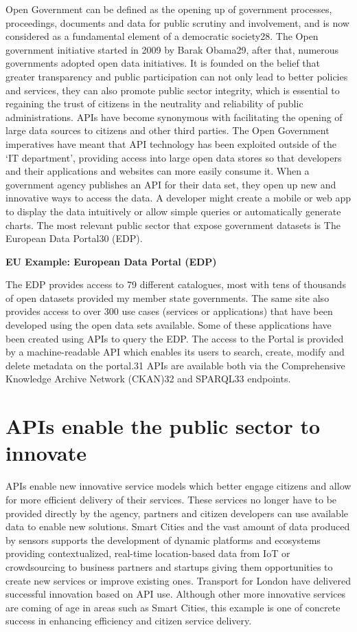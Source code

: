 Open Government can be defined as the opening up of government processes, proceedings, documents
and data for public scrutiny and involvement, and is now considered as a fundamental element of a
democratic society28. The Open government initiative started in 2009 by Barak Obama29, after that,
numerous governments adopted open data initiatives. It is founded on the belief that greater transparency
and public participation can not only lead to better policies and services, they can also promote public
sector integrity, which is essential to regaining the trust of citizens in the neutrality and reliability of public
administrations.
APIs have become synonymous with facilitating the opening of large data sources to citizens and other third
parties. The Open Government imperatives have meant that API technology has been exploited outside of
the ‘IT department’, providing access into large open data stores so that developers and their applications
and websites can more easily consume it. When a government agency publishes an API for their data set,
they open up new and innovative ways to access the data. A developer might create a mobile or web app to
display the data intuitively or allow simple queries or automatically generate charts.
The most relevant public sector that expose government datasets is The European Data Portal30 (EDP).

\textbf{EU Example: European Data Portal (EDP)}

The EDP provides access to 79 different catalogues, most with tens of thousands of open datasets
provided my member state governments. The same site also provides access to over 300 use
cases (services or applications) that have been developed using the open data sets available.
Some of these applications have been created using APIs to query the EDP.
The access to the Portal is provided by a machine-readable API which enables its users to search,
create, modify and delete metadata on the portal.31 APIs are available both via the Comprehensive
Knowledge Archive Network (CKAN)32 and SPARQL33 endpoints.

\section{APIs enable the public sector to innovate}

APIs enable new innovative service models which better engage citizens and allow for more efficient
delivery of their services. These services no longer have to be provided directly by the agency, partners and
citizen developers can use available data to enable new solutions. Smart Cities and the vast amount of data
produced by sensors supports the development of dynamic platforms and ecosystems providing
contextualized, real-time location-based data from IoT or crowdsourcing to business partners and startups
giving them opportunities to create new services or improve existing ones.
Transport for London have delivered successful innovation based on API use. Although other more
innovative services are coming of age in areas such as Smart Cities, this example is one of concrete
success in enhancing efficiency and citizen service delivery.


